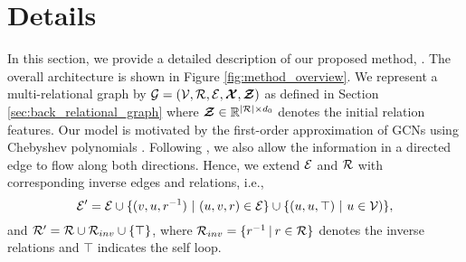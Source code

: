 \documentclass{article} \usepackage{iclr2020_conference,times}
\begin{document}
 \section{\method{} Details}
\label{sec:details}

In this section, we provide a detailed description of our proposed method, \method{}. The overall architecture is shown in Figure \ref{fig:method_overview}. We represent a multi-relational graph by $\mathcal{G}=(\mathcal{V}, \mathcal{R}, \mathcal{E}, \bm{\mathcal{X}},  \bm{\mathcal{Z}})$ as defined in Section \ref{sec:back_relational_graph} where $\bm{\mathcal{Z}} \in \mathbb{R}^{|\mathcal{R}| \times d_0}$ denotes the initial relation features. Our model is motivated by the first-order approximation of GCNs using Chebyshev polynomials \citep{Kipf2016}. Following \citet{gcn_srl}, we also allow the information in a directed edge to flow along both directions. Hence, we extend $\mathcal{E}$ and $\mathcal{R}$ with corresponding inverse edges and relations, i.e., 
\begin{equation*}
\mathcal{E'} = \mathcal{E} \cup \{(v,u,r^{-1})~|~ (u,v,r) \in \mathcal{E}\} \cup \{(u, u, \top)~|~u \in \mathcal{V})\} ,
\end{equation*}
and $\mathcal{R}' = \mathcal{R} \cup \mathcal{R}_{inv} \cup \{\top\}$, where $\mathcal{R}_{inv} =\{ r^{-1} \hspace{2pt} | \hspace{2pt} r \in \mathcal{R} \}$ denotes the inverse relations and $\top$ indicates the self loop.


\begin{table*}[t]
	\centering
	
	\caption{\label{tbl:gcn_model_comp}Comparison of our proposed method, \method{} with other Graph Convolutional methods. Here, $K$ denotes the number of layers in the model, $d$ is the embedding dimension, $\m{B}$ represents the number of bases and $|\m{R}|$ indicates the total number of relations in the graph. Overall, \method{} is most comprehensive and is more parameter efficient than methods which encode relation and direction information.}
\end{table*}
\end{document}
